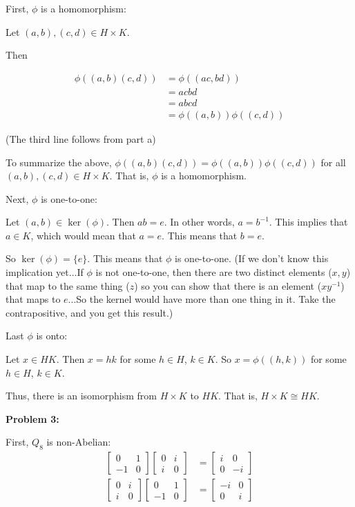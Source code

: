 \documentclass[a4paper,12pt]{article}
\newcommand{\tab}{\hspace{4mm}} %
\newcommand{\shunt}{\vspace{20mm}}
\begin{document}
First, $\phi$ is a homomorphism:

\tab Let $(a,b), (c,d) \in H \times K$.

\tab Then 

\begin{align*}
\phi((a,b)(c,d)) &= \phi((ac,bd)) \\
&= acbd \\
&= abcd \\
&= \phi((a,b))\phi((c,d))
\end{align*}

\tab (The third line follows from part a)

\tab To summarize the above, $\phi((a,b)(c,d)) = \phi((a,b))\phi((c,d))$ for all $(a,b), (c,d) \in H \times K$. That is, $\phi$ is a homomorphism.

Next, $\phi$ is one-to-one:

\tab Let $(a,b) \in \ker(\phi)$. Then $ab = e$. In other words, $a = b^{-1}$. This implies that $a \in K$, which would mean that $a = e$. This means that $b = e$.

\tab So $\ker(\phi) = \{e\}$. This means that $\phi$ is one-to-one. (If we don't know this implication yet...If $\phi$ is not one-to-one, then there are two distinct elements ($x,y$) that map to the same thing ($z$) so you can show that there is an element ($xy^{-1}$) that maps to $e$...So the kernel would have more than one thing in it. Take the contrapositive, and you get this result.)

Last $\phi$ is onto:

\tab Let $x \in HK$. Then $x = hk$ for some $h \in H$, $k \in K$. So $x = \phi((h,k))$ for some $h \in H$, $k \in K$.

Thus, there is an isomorphism from $H \times K$ to $HK$. That is, $H \times K \cong HK$.

\shunt

{\bf Problem 3:}

First, $Q_8$ is non-Abelian: 
\begin{align*}
\left[\begin{smallmatrix}0&1\\ -1&0 \end{smallmatrix}\right] \left[\begin{smallmatrix}0&i\\ i&0 \end{smallmatrix}\right] &= \left[\begin{smallmatrix}i&0\\ 0&-i \end{smallmatrix}\right] \\
\left[\begin{smallmatrix}0&i\\ i&0 \end{smallmatrix}\right] \left[\begin{smallmatrix}0&1\\ -1&0 \end{smallmatrix}\right] &= \left[\begin{smallmatrix}-i&0\\ 0&i \end{smallmatrix}\right]
\end{align*}
\end{document}
